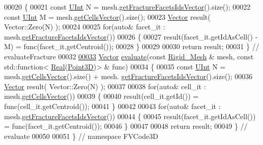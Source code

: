 \begin{DoxyCode}
00020 \{
00021     \textcolor{keyword}{const} \hyperlink{namespaceFVCode3D_a4bf7e328c75d0fd504050d040ebe9eda}{UInt} N = mesh.\hyperlink{classFVCode3D_1_1Rigid__Mesh_aadbe6d9ad704122537903396d91238e0}{getFractureFacetsIdsVector}().size();
00022     \textcolor{keyword}{const} \hyperlink{namespaceFVCode3D_a4bf7e328c75d0fd504050d040ebe9eda}{UInt} M = mesh.\hyperlink{classFVCode3D_1_1Rigid__Mesh_afefb62f2c37317402b495e2369ed495b}{getCellsVector}().size();
00023     \hyperlink{namespaceFVCode3D_a16ccf345652402bccd1a5d2e6782526c}{Vector} result( Vector::Zero(N) );
00024 
00025     \textcolor{keywordflow}{for}(\textcolor{keyword}{auto}& facet\_it : mesh.\hyperlink{classFVCode3D_1_1Rigid__Mesh_aadbe6d9ad704122537903396d91238e0}{getFractureFacetsIdsVector}())
00026     \{
00027         result(facet\_it.getIdAsCell() - M) = func(facet\_it.getCentroid());
00028     \}
00029 
00030     \textcolor{keywordflow}{return} result;
00031 \} \textcolor{comment}{// evaluateFracture}
00032 
\hypertarget{Evaluate_8cpp_source.tex_l00033}{}\hyperlink{namespaceFVCode3D_a113366cb939ded701e04649337315295}{00033} \hyperlink{namespaceFVCode3D_a16ccf345652402bccd1a5d2e6782526c}{Vector} \hyperlink{namespaceFVCode3D_a113366cb939ded701e04649337315295}{evaluate}(\textcolor{keyword}{const} \hyperlink{classFVCode3D_1_1Rigid__Mesh}{Rigid\_Mesh} & mesh, \textcolor{keyword}{const} std::function<
      \hyperlink{namespaceFVCode3D_a40c1f5588a248569d80aa5f867080e83}{Real}(\hyperlink{classFVCode3D_1_1Point3D}{Point3D})> & func)
00034 \{
00035     \textcolor{keyword}{const} \hyperlink{namespaceFVCode3D_a4bf7e328c75d0fd504050d040ebe9eda}{UInt} N = mesh.\hyperlink{classFVCode3D_1_1Rigid__Mesh_afefb62f2c37317402b495e2369ed495b}{getCellsVector}().size() + mesh.
      \hyperlink{classFVCode3D_1_1Rigid__Mesh_aadbe6d9ad704122537903396d91238e0}{getFractureFacetsIdsVector}().size();
00036     \hyperlink{namespaceFVCode3D_a16ccf345652402bccd1a5d2e6782526c}{Vector} result( Vector::Zero(N) );
00037 
00038     \textcolor{keywordflow}{for}(\textcolor{keyword}{auto}& cell\_it : mesh.\hyperlink{classFVCode3D_1_1Rigid__Mesh_afefb62f2c37317402b495e2369ed495b}{getCellsVector}())
00039     \{
00040         result(cell\_it.getId()) = func(cell\_it.getCentroid());
00041     \}
00042 
00043     \textcolor{keywordflow}{for}(\textcolor{keyword}{auto}& facet\_it : mesh.\hyperlink{classFVCode3D_1_1Rigid__Mesh_aadbe6d9ad704122537903396d91238e0}{getFractureFacetsIdsVector}())
00044     \{
00045         result(facet\_it.getIdAsCell()) = func(facet\_it.getCentroid());
00046     \}
00047 
00048     \textcolor{keywordflow}{return} result;
00049 \} \textcolor{comment}{// evaluate}
00050 
00051 \} \textcolor{comment}{// namespace FVCode3D}
\end{DoxyCode}
